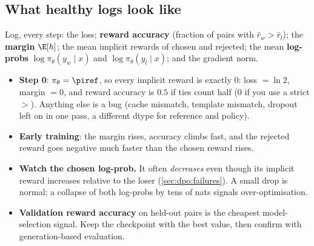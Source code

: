 \subsection{What healthy logs look like}

Log, every step: the loss; \textbf{reward accuracy} (fraction of pairs with $\hat r_w>\hat r_l$); the
\textbf{margin} $\E[h]$; the mean implicit rewards of chosen and rejected; the mean
\textbf{log-probs} $\log\pi_\theta(y_w\mid x)$ and $\log\pi_\theta(y_l\mid x)$; and the gradient norm.
\begin{itemize}
\item \textbf{Step 0}: $\pi_\theta=\piref$, so every implicit reward is exactly 0: loss $=\ln 2$,
  margin $=0$, and reward accuracy is $0.5$ if ties count half (0 if you use a strict $>$). Anything
  else is a bug (cache mismatch, template mismatch, dropout left on in one pass, a different dtype for
  reference and policy).
\item \textbf{Early training}: the margin rises, accuracy climbs fast, and the rejected reward goes
  negative much faster than the chosen reward rises.
\item \textbf{Watch the chosen log-prob.} It often \emph{decreases} even though its implicit reward
  increases relative to the loser (\cref{sec:dpo:failures}). A small drop is normal; a collapse
  of both log-probs by tens of nats signals over-optimisation.
\item \textbf{Validation reward accuracy} on held-out pairs is the cheapest model-selection signal.
  Keep the checkpoint with the best value, then confirm with generation-based evaluation.
\end{itemize}

